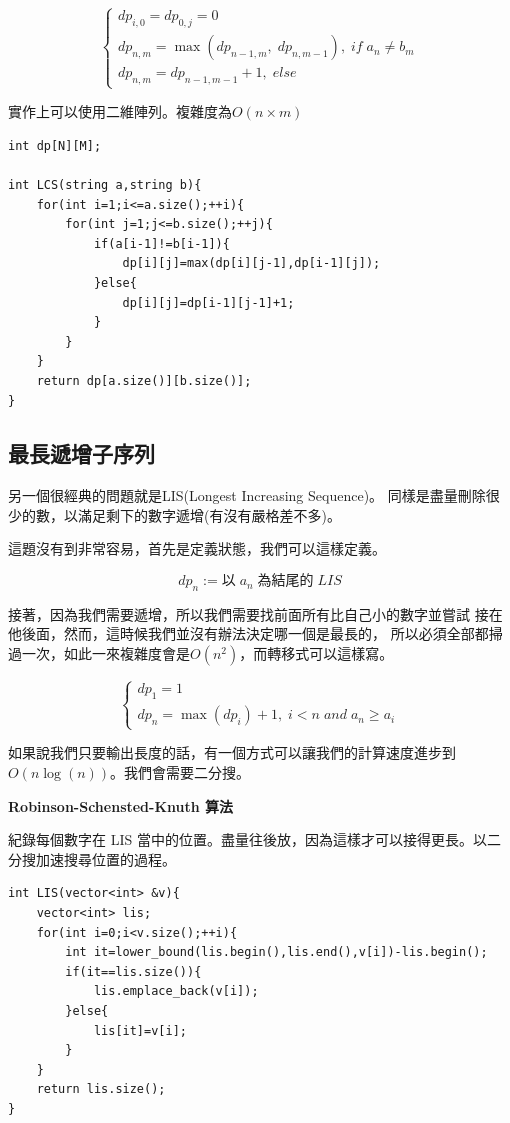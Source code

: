     $$
    \begin{cases}
        dp_{i,0}=dp_{0,j}=0 \\
        dp_{n,m}=\max(dp_{n-1,m}, \; dp_{n,m-1}), \; if \; a_n \ne b_m \\
        dp_{n,m}=dp_{n-1,m-1}+1, \; else
    \end{cases}
    $$
    
    實作上可以使用二維陣列。複雜度為$O(n \times m)$

\begin{lstlisting}[caption=LCS]
int dp[N][M];

int LCS(string a,string b){
    for(int i=1;i<=a.size();++i){
        for(int j=1;j<=b.size();++j){
            if(a[i-1]!=b[i-1]){
                dp[i][j]=max(dp[i][j-1],dp[i-1][j]);
            }else{
                dp[i][j]=dp[i-1][j-1]+1;
            }
        }
    }
    return dp[a.size()][b.size()];
}
\end{lstlisting}

    \subsection{最長遞增子序列}
    另一個很經典的問題就是LIS(Longest Increasing Sequence)。
    同樣是盡量刪除很少的數，以滿足剩下的數字遞增(有沒有嚴格差不多)。

    這題沒有到非常容易，首先是定義狀態，我們可以這樣定義。

    $$dp_n := 以 \; a_n \; 為結尾的 \; LIS$$

    接著，因為我們需要遞增，所以我們需要找前面所有比自己小的數字並嘗試
    接在他後面，然而，這時候我們並沒有辦法決定哪一個是最長的，
    所以必須全部都掃過一次，如此一來複雜度會是$O(n^2)$，而轉移式可以這樣寫。

    $$
    \begin{cases}
        dp_1=1 \\
        dp_n= \max(dp_{i})+1, \; i < n \; and \; a_n \ge a_i
    \end{cases}
    $$

    如果說我們只要輸出長度的話，有一個方式可以讓我們的計算速度進步到
    $O(n \log{(n)})$。我們會需要二分搜。

    \textbf{Robinson-Schensted-Knuth 算法}

    紀錄每個數字在 LIS 當中的位置。盡量往後放，因為這樣才可以接得更長。以二分搜加速搜尋位置的過程。

\begin{lstlisting}[caption=LIS 長度]
int LIS(vector<int> &v){
    vector<int> lis;
    for(int i=0;i<v.size();++i){
        int it=lower_bound(lis.begin(),lis.end(),v[i])-lis.begin();
        if(it==lis.size()){
            lis.emplace_back(v[i]);
        }else{
            lis[it]=v[i];
        }
    }
    return lis.size();
}
\end{lstlisting}

